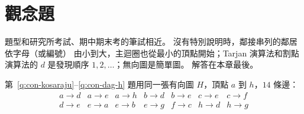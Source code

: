 \section{觀念題}
\label{sec:con-exercises}

題型和研究所考試、期中期末考的筆試相近。 沒有特別說明時，鄰接串列的鄰居依字母（或編號）
由小到大，主迴圈也從最小的頂點開始；Tarjan 演算法和割點演算法的 $d$ 是發現順序
$1, 2, \ldots$；無向圖是簡單圖。 解答在本章最後。

第~\ref{q:con-kosaraju}--\ref{q:con-dag-h} 題用同一張有向圖 $H$，頂點 $a$ 到 $h$，$14$ 條邊：
\[
\begin{array}{lllllll}
a \to d & a \to e & a \to h & b \to d & b \to e & c \to e & c \to f \\
d \to e & e \to a & e \to b & e \to g & f \to c & h \to d & h \to g
\end{array}
\]

